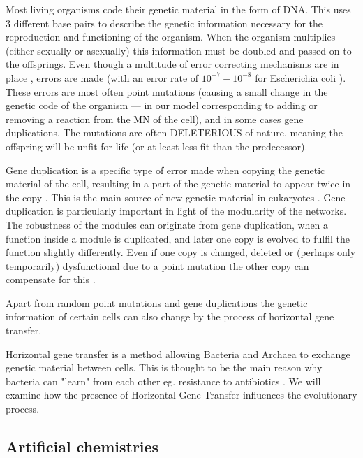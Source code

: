 \documentclass[10pt,a4paper]{article}
\begin{document}
	Most living organisms code their genetic material in the form of DNA. This uses 3 different base pairs to describe the genetic information necessary for the reproduction and functioning of the organism. When the organism multiplies (either sexually or asexually) this information must be doubled and passed on to the offsprings. Even though a multitude of error correcting mechanisms are in place \cite{dnarepair}, errors are made (with an error rate of $10^{-7} - 10^{-8}$ for Escherichia coli \cite{dnaerrorrate}). These errors are most often point mutations (causing a small change in the genetic code of the organism --- in our model  corresponding to adding or removing a reaction from the MN of the cell), and in some cases gene duplications. The mutations are often DELETERIOUS of nature, meaning the offspring will be unfit for life (or at least less fit than the predecessor). 


	Gene duplication is a specific type of error made when copying the genetic material of the cell, resulting in a part of the genetic material to appear twice in the copy \cite{geneduplication}. This is the main source of new genetic material in eukaryotes \cite{horizontalgenetransfer}. Gene duplication is particularly important in light of the modularity of the networks. The robustness of the modules can originate from gene duplication, when a function inside a module is duplicated, and later one copy is evolved to fulfil the function slightly differently. Even if one copy is changed, deleted or (perhaps only temporarily) dysfunctional due to a point mutation the other copy can compensate for this \cite{duplicaterole} \cite{complexfeatures}. 
	
	Apart from random point mutations  and gene duplications the genetic information of certain cells can also change by the process of horizontal gene transfer.

	Horizontal gene transfer is a method allowing Bacteria and Archaea to exchange genetic material between cells. This is thought to be the main reason why bacteria can "learn" from each other eg. resistance to antibiotics \cite{horizontalAntibiotics}\cite{horizontalgenetransfer}. We will examine how the presence of Horizontal Gene Transfer influences the evolutionary process.
	
	
	
	\subsection{Artificial chemistries}
	\label{sub:artificial_chemistries}
\end{document}
